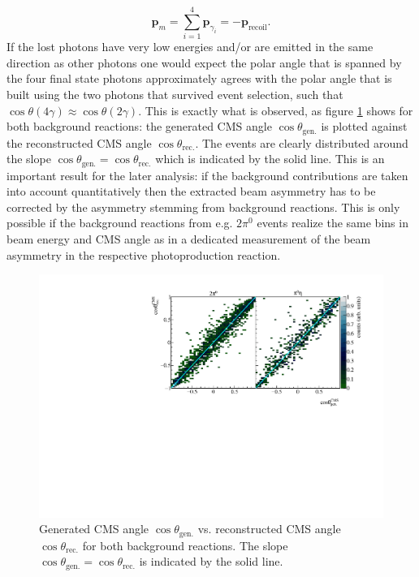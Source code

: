 $$
	\mathbf{p}_m=\sum_{i=1}^4\mathbf{p}_{\gamma_i}=-\mathbf{p}_\text{recoil}.
$$ If the lost photons have very low energies and/or are emitted in the same direction as other photons one would expect the polar angle that is spanned by the four final state photons approximately agrees with the polar angle that is built using the two photons that survived event selection, such that $\cos\theta(4\gamma)\approx\cos\theta(2\gamma)$. This is exactly what is observed, as figure \ref{fig:mccostheta} shows for both background reactions: the generated CMS angle $\cos\theta_\text{gen.}$ is plotted against the reconstructed CMS angle $\cos\theta_\text{rec.}$. The events are clearly distributed around the slope $\cos\theta_\text{gen.}=\cos\theta_\text{rec.}$ which is indicated by the solid line. This is an important result for the later analysis: if the background contributions are taken into account quantitatively then the extracted beam asymmetry has to be corrected by the asymmetry stemming from background reactions. This is only possible if the background reactions from e.g. $2\pi^0$ events realize the same bins in beam energy and CMS angle as in a dedicated measurement of the beam asymmetry in the respective photoproduction reaction. 
\begin{figure}[htbp]
	\centering
	\includegraphics[width=\linewidth]{../figs/hydrogen/mcgammas_ct.pdf}
	\caption{Generated CMS angle $\cos\theta_\text{gen.}$ vs. reconstructed CMS angle $\cos\theta_\text{rec.}$ for both background reactions. The slope $\cos\theta_\text{gen.}=\cos\theta_\text{rec.}$ is indicated by the solid line.}
	\label{fig:mccostheta}
\end{figure}
